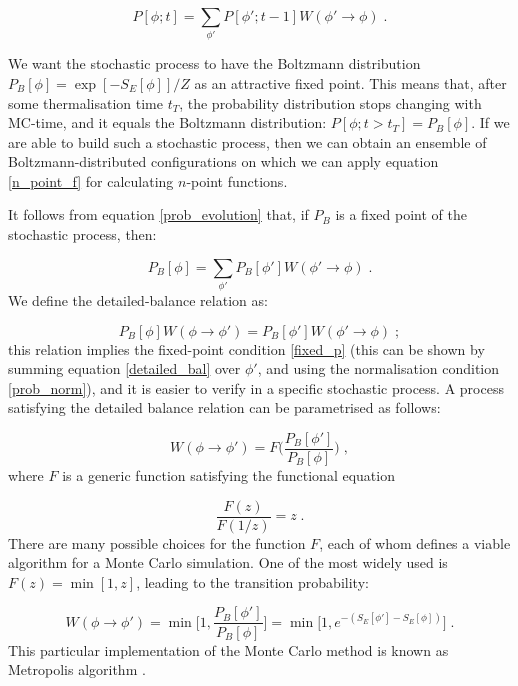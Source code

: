 \begin{equation}
P[\phi; t] = \sum_{\phi'} P[\phi'; t-1] W(\phi' \to \phi) \; .
\label{prob_evolution}
\end{equation}

We want the stochastic process to have the Boltzmann distribution $P_B[\phi] = \exp[-S_E[\phi]]/Z$ as an attractive fixed point. This means that, after some thermalisation time $t_T$, the probability distribution stops changing with MC-time, and it equals the Boltzmann distribution: $P[\phi; t>t_T] = P_B[\phi]$. If we are able to build such a stochastic process, then we can obtain an ensemble of Boltzmann-distributed configurations on which we can apply equation \ref{n_point_f} for calculating $n$-point functions.

It follows from equation \ref{prob_evolution} that, if $P_B$ is a fixed point of the stochastic process, then:

\begin{equation}
P_B[\phi] = \sum_{\phi'} P_B[\phi'] W(\phi' \to \phi) \; .
\label{fixed_p}
\end{equation}
%
We define the detailed-balance relation as:

\begin{equation}
P_B[\phi] W(\phi \to \phi') = P_B[\phi'] W(\phi' \to \phi) \; ;
\label{detailed_bal}
\end{equation}
%
this relation implies the fixed-point condition \ref{fixed_p} (this can be shown by summing equation \ref{detailed_bal} over $\phi'$, and using the normalisation condition \ref{prob_norm}), and it is easier to verify in a specific stochastic process. A process satisfying the detailed balance relation can be parametrised as follows:

\begin{equation}
W(\phi \to \phi') = F\biggl(\frac{P_B[\phi']}{P_B[\phi]} \biggr) \; ,
\label{F1}
\end{equation}
%
where $F$ is a generic function satisfying the functional equation

\begin{equation}
\frac{F(z)}{F(1/z)} = z \; .
\label{F2}
\end{equation}
%
There are many possible choices for the function $F$, each of whom defines a viable algorithm for a Monte Carlo simulation. One of the most widely used is $F(z) = \min [1,z]$, leading to the transition probability:

\begin{equation}
W(\phi \to \phi') = \min\biggl[1, \frac{P_B[\phi']}{P_B[\phi]}\biggl] = \min\bigl[1,e^{-(S_E[\phi'] - S_E[\phi])}\bigr] \; .
\label{Metropolis}
\end{equation}
%
This particular implementation of the Monte Carlo method is known as Metropolis algorithm \cite{Metropolis:1953am}.

